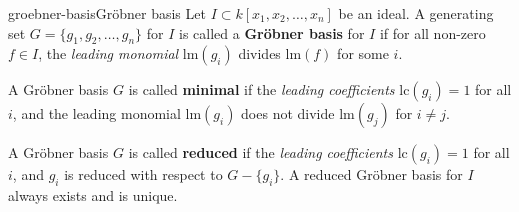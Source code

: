 \begin{topic}{groebner-basis}{Gröbner basis}
    Let $I \subset k[x_1, x_2, \ldots, x_n]$ be an ideal. A generating set $G = \{ g_1, g_2, \ldots, g_n \}$ for $I$ is called a \textbf{Gröbner basis} for $I$ if for all non-zero $f \in I$, the \textit{leading monomial} $\text{lm}(g_i)$ divides $\text{lm}(f)$ for some $i$.
    
    A Gröbner basis $G$ is called \textbf{minimal} if the \textit{leading coefficients} $\text{lc}(g_i) = 1$ for all $i$, and the leading monomial $\text{lm}(g_i)$ does not divide $\text{lm}(g_j)$ for $i \ne j$.
    
    A Gröbner basis $G$ is called \textbf{reduced} if the \textit{leading coefficients} $\text{lc}(g_i) = 1$ for all $i$, and $g_i$ is reduced with respect to $G - \{ g_i \}$. A reduced Gröbner basis for $I$ always exists and is unique.
\end{topic}
